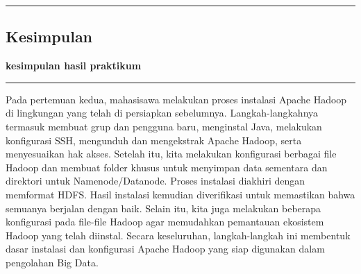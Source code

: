 {\color{gray}\hrule}
\begin{center}
\section{Kesimpulan}
\textbf{kesimpulan hasil praktikum}
\end{center}
{\color{gray}\hrule}
\vspace{0.5cm}
Pada pertemuan kedua, mahasisawa melakukan proses instalasi Apache Hadoop di lingkungan yang telah di persiapkan sebelumnya. Langkah-langkahnya termasuk membuat grup dan pengguna baru, menginstal Java, melakukan konfigurasi SSH, mengunduh dan mengekstrak Apache Hadoop, serta menyesuaikan hak akses. Setelah itu, kita melakukan konfigurasi berbagai file Hadoop dan membuat folder khusus untuk menyimpan data sementara dan direktori untuk Namenode/Datanode. Proses instalasi diakhiri dengan memformat HDFS. Hasil instalasi kemudian diverifikasi untuk memastikan bahwa semuanya berjalan dengan baik. Selain itu, kita juga melakukan beberapa konfigurasi pada file-file Hadoop agar memudahkan pemantauan ekosistem Hadoop yang telah diinstal. Secara keseluruhan, langkah-langkah ini membentuk dasar instalasi dan konfigurasi Apache Hadoop yang siap digunakan dalam pengolahan Big Data.
